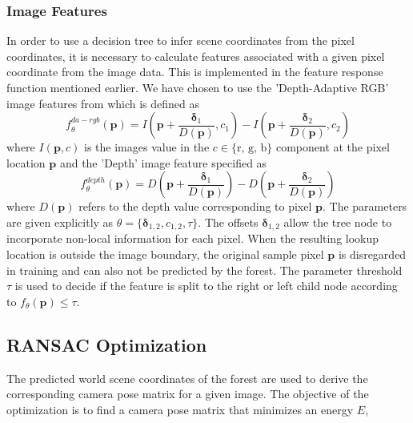 \documentclass[final]{cvpr}
\begin{document}
\subsubsection{Image Features}
In order to use a decision tree to infer scene coordinates from the pixel coordinates,
it is necessary to calculate features associated with a given pixel coordinate from the
image data. This is implemented in the feature response function mentioned earlier.
We have chosen to use the 'Depth-Adaptive RGB' image features from \cite{shotton2013} which
is defined as
\begin{equation}
	f_{\theta}^{da-rgb}(\boldsymbol{p}) = I\left(\boldsymbol{p} + \frac{\boldsymbol{\delta}_1}{D(\boldsymbol{p})}, c_1\right)
	- I\left(\boldsymbol{p} + \frac{\boldsymbol{\delta}_2}{D(\boldsymbol{p})}, c_2\right)
\end{equation}
where $I(\boldsymbol{p}, c)$ is the images value in the $c \in \{\text{r, g, b}\}$ component at
the pixel location $\boldsymbol{p}$ and the 'Depth' image feature specified as
\begin{equation}
	f_{\theta}^{depth}(\boldsymbol{p}) = D\left(\boldsymbol{p} + \frac{\boldsymbol{\delta}_1}{D(\boldsymbol{p})}\right)
	- D\left(\boldsymbol{p} + \frac{\boldsymbol{\delta}_2}{D(\boldsymbol{p})}\right)
\end{equation}
where $D(\boldsymbol{p})$ refers to the depth value corresponding to pixel $\boldsymbol{p}$.
The parameters are given explicitly as $\theta = \{\boldsymbol{\delta}_{1,2}, c_{1,2}, \tau\}$. 
The offsets $\boldsymbol{\delta}_{1,2}$
allow the tree node to incorporate non-local information for each pixel. When the resulting
lookup location is outside the image boundary, the original sample pixel $\boldsymbol{p}$ is
disregarded in training and can also not be predicted by the forest. The parameter threshold 
$\tau$ is used to decide if the feature is split to the right or left child node according to 
$f_{\theta}(\boldsymbol{p}) \leq \tau$.


\subsection{RANSAC Optimization}
The predicted world scene coordinates of the forest are used to derive the corresponding camera pose matrix for a given image. 
The objective of the optimization is to find a camera pose matrix that minimizes an energy $E$,
\end{document}
